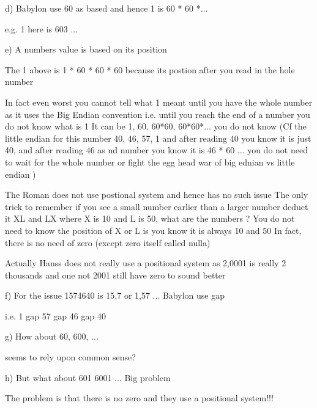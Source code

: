 \documentclass[letterpaper,10pt,english]{jupyterBook}
\begin{document}
\begin{sphinxVerbatim}[commandchars=\\\{\}]
        d) Babylon use 60 as based and hence 1 is 60 * 60 *...
        
            e.g. 1 here is 60\PYGZca{}3 ...
        
        e) A number\PYGZsq{}s value is based on its position
        
            The 1 above is 1 * 60 * 60 * 60 because its postion after you read in the hole number
        
            In fact even worst you cannot tell what 1 meant until you have the whole number
                as it uses the Big Endian convention 
                i.e. until you reach the end of a number you do not know what is 1
                It can be 1, 60, 60*60, 60*60*... you do not know
                (Cf the little endian for this number 40, 46, 57, 1
                 and after reading 40 you know it is just 40, 
                 and after reading 46 as \PYGZdq{}nd number you know it is 46 * 60 ...
                 you do not need to wait for the whole number
                 or fight the egg head war of big ednian vs little endian )
                 
            The Roman does not use postional system and hence has no such issue
                The only trick to remember if you see a small number earlier than a larger number deduct it
                XL and LX where X is 10 and L is 50, what are the numbers ?
                You do not need to know the position of X or L is you know it is always 10 and 50
                In fact, there is no need of zero (except zero itself called nulla)
                
            Actually Hans\PYGZsq{}s does not really use a positional system 
                as 2,0001 is really 2 thousands and one not 2001
                still have zero to sound better
                 
        f) For the issue 1574640 is 15,7 or 1,57 ... Babylon use gap
        
            i.e. 1 gap 57 gap 46 gap 40
            
        g) How about 60, 600, ... 
        
            seems to rely upon common sense?
        
        h) But what about 601 6001 ... Big problem
        
           The problem is that there is no zero and they use a positional system!!!
\end{sphinxVerbatim}
\end{document}
